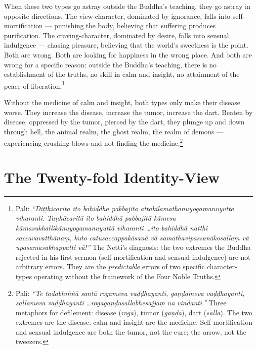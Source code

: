 When these two types go astray outside the Buddha's teaching, they go astray in opposite directions. The view-character, dominated by ignorance, falls into self-mortification --- punishing the body, believing that suffering produces purification. The craving-character, dominated by desire, falls into sensual indulgence --- chasing pleasure, believing that the world's sweetness is the point. Both are wrong. Both are looking for happiness in the wrong place. And both are wrong for a specific reason: outside the Buddha's teaching, there is no establishment of the truths, no skill in calm and insight, no attainment of the peace of liberation.\footnote{Pali: \textit{``Diṭṭhicaritā ito bahiddhā pabbajitā attakilamathānuyogamanuyuttā viharanti. Taṇhācaritā ito bahiddhā pabbajitā kāmesu kāmasukhallikānuyogamanuyuttā viharanti \ldots ito bahiddhā natthi saccavavatthānaṃ, kuto catusaccappakāsanā vā samathavipassanākosallaṃ vā upasamasukhappatti vā!''} The Netti's diagnosis: the two extremes the Buddha rejected in his first sermon (self-mortification and sensual indulgence) are not arbitrary errors. They are the \textit{predictable} errors of two specific character-types operating without the framework of the Four Noble Truths.}

Without the medicine of calm and insight, both types only make their disease worse. They increase the disease, increase the tumor, increase the dart. Beaten by disease, oppressed by the tumor, pierced by the dart, they plunge up and down through hell, the animal realm, the ghost realm, the realm of demons --- experiencing crushing blows and not finding the medicine.\footnote{Pali: \textit{``Te tadabhiññā santā rogameva vaḍḍhayanti, gaṇḍameva vaḍḍhayanti, sallameva vaḍḍhayanti \ldots rogagaṇḍasallabhesajjaṃ na vindanti.''} Three metaphors for defilement: disease (\textit{roga}), tumor (\textit{gaṇḍa}), dart (\textit{salla}). The two extremes are the disease; calm and insight are the medicine. Self-mortification and sensual indulgence are both the tumor, not the cure; the arrow, not the tweezers.}

\section*{The Twenty-fold Identity-View}

